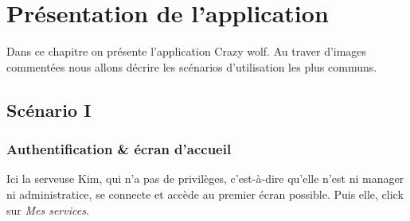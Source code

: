 \chapter[L'application]{Présentation de l'application}

Dans ce chapitre on présente l'application Crazy wolf. 
Au traver d'images commentées nous allons décrire les scénarios
d'utilisation les plus communs.
\section[Authentification \& écran d'accueil - Scénario I]{Scénario I}
\subsection*{Authentification \& écran d'accueil}
Ici la serveuse Kim, qui n'a pas de privilèges, c'est-à-dire qu'elle n'est 
ni manager ni administratice, se connecte et accède au premier écran possible.
Puis elle, click sur \textit{Mes services}.

